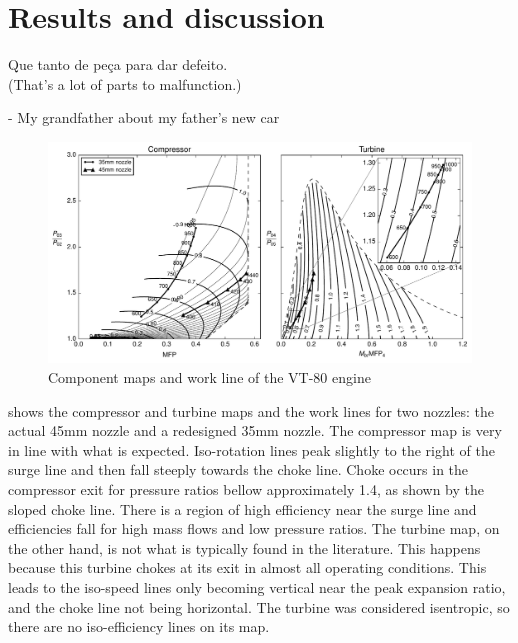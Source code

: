\chapter{Results and discussion}
\label{sec:results}
\epigraph{Que tanto de peça para dar defeito.\\{\footnotesize (That's a lot of parts to malfunction.)}}{- My grandfather about my father's new car}

\begin{figure}
    \AddThispageHook{\thispagestyle{empty}}
    \caption{Component maps and work line of the VT-80 engine}
    \label{fig:wline}
\includegraphics{fig/wline.pdf}
\end{figure}


 shows the compressor and turbine maps and the work lines for
two nozzles: the actual 45mm nozzle and a redesigned 35mm nozzle.  The
compressor map is very in line with what is expected. Iso-rotation lines peak
slightly to the right of the surge line and then fall steeply towards the choke
line. Choke occurs in the compressor exit for pressure ratios bellow
approximately 1.4, as shown by the sloped choke line. There is a region of high efficiency near the surge line and
efficiencies fall for high mass flows and low pressure ratios. The turbine map,
on the other hand, is not what is typically found in the literature. This
happens because this turbine chokes at its exit in almost all operating
conditions. This leads to the iso-speed lines only becoming vertical near the
peak expansion ratio, and the choke line not being horizontal. 
The turbine was considered isentropic, so there are no iso-efficiency lines on its map.

